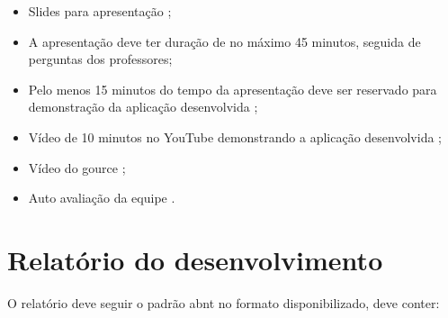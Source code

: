\begin{itemize}

    \item Slides para apresentação  ;
    
    \item A apresentação deve ter duração de no máximo 45 minutos, seguida de perguntas dos professores;
    
    \item Pelo menos 15 minutos do tempo da apresentação deve ser reservado para demonstração da aplicação desenvolvida ;
    
    \item Vídeo de 10 minutos no YouTube demonstrando a aplicação desenvolvida ;
    
    \item Vídeo do \gls{gource} ;
    
    \item Auto avaliação da equipe .
\end{itemize}


\section{Relatório do desenvolvimento}\label{atv-relatorio-do-desenvolvimento}

O relatório deve seguir o padrão \ac{abnt} no formato disponibilizado, deve conter:

